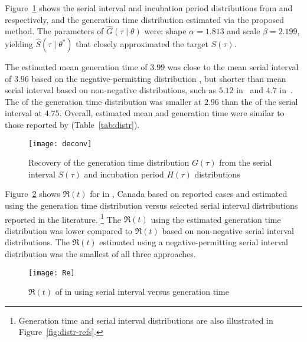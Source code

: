 Figure~\ref{fig:deconv} shows the
serial interval and incubation period distributions
from \cite{Du2020} and \cite{Lauer2020} respectively,
and the generation time distribution estimated via the proposed method.  %
The \mle parameters of $\hat{G}(\tau\mid\theta)$ were:
shape ${\alpha = 1.813}$ and scale ${\beta = 2.199}$,
yielding $\hat{S}(\tau\mid\theta^*)$ that closely approximated
the target $S(\tau)$.
\par
The estimated mean generation time of $3.99$ was close to
the mean serial interval of $3.96$
based on the negative-permitting distribution \cite{Du2020},
but shorter than mean serial interval based on non-negative distributions,
such as $5.12$ in~\cite{Zhang2020} and $4.7$ in~\cite{Nishiura2020}.
The \sd of the generation time distribution was smaller at $2.96$
than the \sd of the serial interval at $4.75$.
Overall, estimated mean and \sd generation time
were similar to those reported by \textcite{Ganyani2020}  %
(Table~\ref{tab:distr}).
\par
\begin{figure}
  \centering
  \texttt{[image: deconv]}
  \caption{Recovery of the generation time distribution $G(\tau)$
    from the serial interval $S(\tau)$
    and incubation period $H(\tau)$ distributions}
  \label{fig:deconv}
\end{figure}
\par
Figure~\ref{fig:Re(t)} shows
$\Re(t)$ for \covid in \gta, Canada
based on reported cases and estimated using
the generation time distribution versus
selected serial interval distributions reported in the literature.%
\footnote{Generation time and serial interval distributions
  are also illustrated in Figure~\ref{fig:distr-refs}.}
The $\Re(t)$ using the estimated generation time distribution
was lower compared to $\Re(t)$ based on non-negative serial interval distributions.  %
The $\Re(t)$ estimated using
a negative-permitting serial interval distribution was the smallest of all three approaches. %
\par
\begin{figure}[h]
  \centering
  \texttt{[image: Re]}
  \caption{$\Re(t)$ of \covid in \gta using
    serial interval versus generation time}
  \label{fig:Re(t)}
\end{figure}